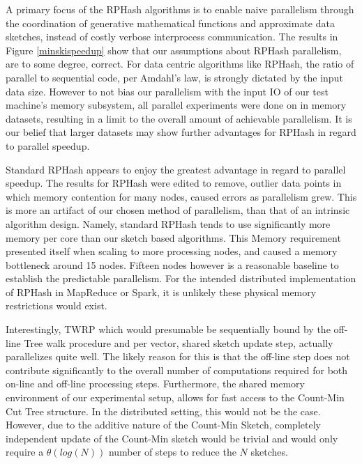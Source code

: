 A primary focus of the \textsf{RPHash} algorithms is to enable naive parallelism through the coordination of
generative mathematical functions and approximate data sketches, instead of costly verbose
interprocess communication.  The results in Figure \ref{minskispeedup} show that our assumptions about
\textsf{RPHash} parallelism, are to some degree, correct.  For data centric algorithms like \textsf{RPHash}, the ratio
of parallel to sequential code, per Amdahl's law, is strongly dictated by the input data size.
However to not bias our parallelism with the input IO of our test machine's memory subsystem, all
parallel experiments were done on in memory datasets, resulting in a limit to the overall amount of
achievable parallelism.  It is our belief that larger datasets may show further advantages for
\textsf{RPHash} in regard to parallel speedup.

Standard \textsf{RPHash} appears to enjoy the greatest advantage in regard to parallel speedup. The results
for \textsf{RPHash} were edited to remove, outlier data points in which memory contention for many nodes,
caused errors as parallelism grew.  This is more an artifact of our chosen method of parallelism,
than that of an intrinsic algorithm design.  Namely, standard \textsf{RPHash} tends to use significantly more
memory per core than our sketch based algorithms.  This Memory requirement presented itself when
scaling to more processing nodes, and caused a memory bottleneck around 15 nodes.  Fifteen nodes
however is a reasonable baseline to establish the predictable parallelism.  For the intended
distributed implementation of \textsf{RPHash} in MapReduce or Spark, it is unlikely these physical memory
restrictions would exist.

Interestingly, \textsf{TWRP} which would presumable be sequentially bound by the off-line Tree walk procedure
and per vector, shared sketch update step, actually parallelizes quite well.  The likely reason for
this is that the off-line step does not contribute significantly to the overall number of
computations required for both on-line and off-line processing steps.  Furthermore, the shared memory
environment of our experimental setup, allows for fast access to the Count-Min Cut Tree structure.
In the distributed setting, this would not be the case.  However, due to the additive nature of the
Count-Min Sketch, completely independent update of the Count-Min sketch would be trivial and would
only require a $\theta(log(N))$ number of steps to reduce the $N$ sketches.


